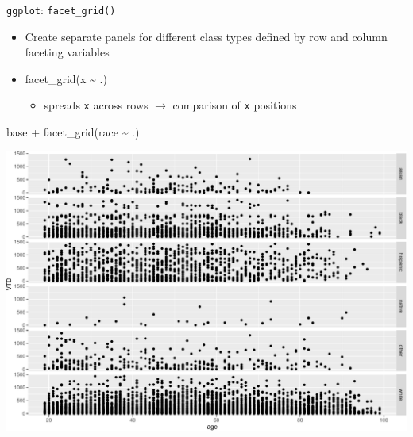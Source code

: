 \documentclass[
  ignorenonframetext,
]{beamer}
\newenvironment{Shaded}{\begin{snugshade}}{\end{snugshade}}
\newcommand{\FunctionTok}[1]{\textcolor[rgb]{0.28,0.35,0.67}{#1}}
\newcommand{\NormalTok}[1]{\textcolor[rgb]{0.00,0.23,0.31}{#1}}
\newcommand{\SpecialCharTok}[1]{\textcolor[rgb]{0.37,0.37,0.37}{#1}}
\providecommand{\tightlist}{%
  \setlength{\itemsep}{0pt}\setlength{\parskip}{0pt}}\usepackage{longtable,booktabs,array}
\begin{document}
\begin{frame}[fragile]{\texttt{ggplot}: \texttt{facet\_grid()}}
\protect\hypertarget{ggplot-facet_grid-1}{}
\begin{itemize}
\tightlist
\item
  Create separate panels for different class types defined by row and
  column faceting variables
\item
  facet\_grid(x \textasciitilde{} .)

  \begin{itemize}
  \tightlist
  \item
    spreads \texttt{x} across rows \(\rightarrow\) comparison of
    \texttt{x} positions
  \end{itemize}
\end{itemize}

\begin{Shaded}
\begin{Highlighting}[]
\NormalTok{base }\SpecialCharTok{+}
  \FunctionTok{facet\_grid}\NormalTok{(race }\SpecialCharTok{\textasciitilde{}}\NormalTok{ .)}
\end{Highlighting}
\end{Shaded}
\end{frame}

\begin{frame}
\includegraphics{uncertainty-tidy-1_files/figure-beamer/unnamed-chunk-17-1.pdf}
\end{frame}
\end{document}
